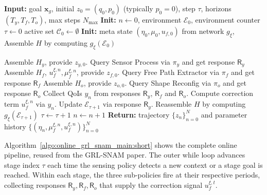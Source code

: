 \begin{algorithm}[htbp]
\caption{Online GRL-SNAM pipeline}
\label{algo:online_grl_snam_main:short}
\begin{algorithmic}[1]
\State \textbf{Input:} goal $\mathbf{x}_g$, initial $z_0=(q_0,p_0)$ (typically $p_0{=}0$), step $\tau$, horizons $(T_y,T_f,T_o)$, max steps $N_{\max}$
\State \textbf{Init:} $n\!\leftarrow\!0$, environment $\mathcal{E}_0$, environment counter $\tau\gets 0$ active set $\mathcal{C}_0\!\leftarrow\!\emptyset$
\State \textbf{Init:} meta state $(\eta_0,\mu_0,u_{f,0})$ from network $g_\xi$,
\State Assemble $H$ by computing $g_{\xi}(\mathcal{E}_{0})$
    
        \State Assemble $H_y$, provide $z_{y,0}$.
        \State Query Sensor Process via $\pi_y$ and get response $\mathsf{R}_y$
    \EndIf
        \State Assemble $H_f$, $u_{f}^{\xi,n}, \mu_{f}^{\xi,n}$, provide $z_{f,0}$.
        \State Query Free Path Extractor via $\pi_f$ and get response $\mathsf{R}_f$
    \EndIf
        \State Assemble $H_o$, provide $z_{o,0}$.
        \State Query Shape Reconfig via $\pi_o$ and get response $\mathsf{R}_o$
    \EndIf
    \State Collect QoIs $y_n$ from responses $\mathsf{R}_y$, $\mathsf{R}_f$ and $\mathsf{R}_o$.
    \State Compute correction term $u_f^{\xi,n}$ via $y_n$.
    \State Update $\mathcal{E}_{\tau+1}$ via response $\mathsf{R}_y$.
    \State Reassemble $H$ by computing $g_{\xi}(\mathcal{E}_{\tau+1})$
    \State $\tau\gets \tau+1$
    \EndIf
    \State $n\leftarrow n+1$
\EndWhile
\State \textbf{Return:} trajectory $\{z_n\}_{n=0}^{N}$ and parameter history $\{(\eta_n,\mu_{f}^{\xi,n},u_{f}^{\xi,n})\}_{n=0}^{N}$
\end{algorithmic}
\end{algorithm}

Algorithm~\ref{algo:online_grl_snam_main:short} shows the complete
online pipeline, reused from the GRL-SNAM paper.
The outer while loop advances stage index $\tau$ each time the
sensing policy detects a new context or a stage goal is reached.
Within each stage, the three sub-policies fire at their respective
periods, collecting responses $\mathsf{R}_y, \mathsf{R}_f, \mathsf{R}_o$
that supply the correction signal $u_f^{\xi,t}$.

% 

